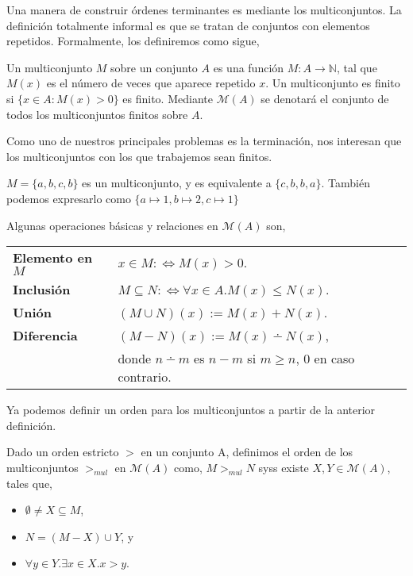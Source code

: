 Una manera de construir órdenes terminantes es mediante los multiconjuntos. La
definición totalmente informal es que se tratan de conjuntos con elementos
repetidos. Formalmente, los definiremos como sigue,

\begin{defi}
  Un multiconjunto $M$ sobre un conjunto $A$ es una función
  $M : A \rightarrow \mathbb{N}$, tal que $M(x)$ es el número de veces que
  aparece repetido $x$. Un multiconjunto es finito si $\{x \in A : M(x) > 0\}$
  es finito. Mediante $\mathcal{M}(A)$ se denotará el conjunto de todos los
  multiconjuntos finitos sobre $A$.
\end{defi}

Como uno de nuestros principales problemas es la terminación, nos interesan que
los multiconjuntos con los que trabajemos sean finitos.

\begin{ejem} 
  $M = \{a,b,c,b\}$ es un multiconjunto, y es equivalente a
  $\{c,b,b,a\}$. También podemos expresarlo como
  $\{a\mapsto 1, b \mapsto 2, c\mapsto 1\}$
\end{ejem}

\begin{defi} 
  Algunas operaciones básicas y relaciones en $\mathcal{M}(A)$ son, \\
  \begin{tabular}{ll}
    \textbf{Elemento en $M$}
    & $x \in M :\Leftrightarrow M(x) > 0$. \\
    \textbf{Inclusión}     
    & $M \subseteq N :\Leftrightarrow \forall x \in A. M(x) \leq N(x)$. \\ 
    \textbf{Unión}        
    & $(M \cup N)(x) := M(x) + N(x)$.   \\ 
    \textbf{Diferencia}   
    & $(M - N)(x):= M(x) \dotminus N(x)$, \\ 
    & donde $n \dotminus m$ es $n-m$
      si $m \geq n$, 0 en caso contrario.     
  \end{tabular}
\end{defi}

Ya podemos definir un orden para los multiconjuntos a partir de la anterior
definición.

\begin{defi} 
  Dado un orden estricto $>$ en un conjunto A, definimos el orden de los
  multiconjuntos $>_{mul}$ en $\mathcal{M}(A)$ como, $M >_{mul} N$ syss existe
  $X, Y \in \mathcal{M}(A)$, tales que,
  \begin{itemize}
  \item $\emptyset \neq X \subseteq M$,
  \item $N = (M - X) \cup Y$, y 
  \item $\forall y \in Y. \exists x \in X. x>y$.
  \end{itemize}
\end{defi}

